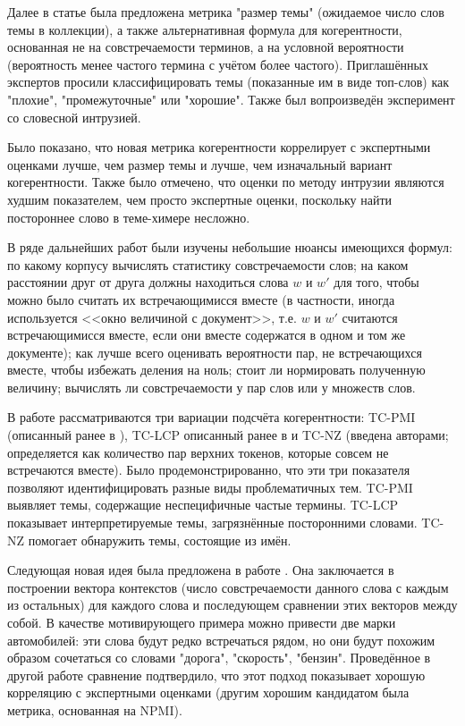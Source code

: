 Далее в статье \cite{mimno2011} была предложена метрика "размер темы" (ожидаемое число слов темы в коллекции), а также альтернативная формула для когерентности, основанная не на совстречаемости терминов, а на условной вероятности (вероятность менее частого термина с учётом более частого). Приглашённых экспертов просили классифицировать темы (показанные им в виде топ-слов) как "плохие", "промежуточные" или "хорошие". Также был вопроизведён эксперимент со словесной интрузией. 

Было показано, что новая метрика когерентности коррелирует с экспертными оценками лучше, чем размер темы и лучше, чем изначальный вариант когерентности. Также было отмечено, что оценки по методу интрузии являются худшим показателем, чем просто экспертные оценки, поскольку найти постороннее слово в теме-химере несложно.

В ряде дальнейших работ были изучены небольшие нюансы имеющихся формул: по какому корпусу вычислять статистику совстречаемости слов; на каком расстоянии друг от друга должны находиться слова $w$ и $w'$ для того, чтобы можно было считать их встречающимисся вместе (в частности, иногда используется <<окно величиной с документ>>, т.е. $w$ и $w'$ считаются встречающимисся вместе, если они вместе содержатся в одном и том же документе); как лучше всего оценивать вероятности пар, не встречающихся вместе, чтобы избежать деления на ноль; стоит ли нормировать полученную величину; вычислять ли совстречаемости у пар слов или у множеств слов.

В работе \cite{boydcare} рассматриваются три вариации подсчёта когерентности: TC-PMI (описанный ранее в \cite{newman2010automatic}), TC-LCP описанный ранее в \cite{mimno} и TC-NZ (введена авторами; определяется как количество пар верхних токенов, которые совсем не встречаются вместе). Было продемонстрированно, что эти три показателя позволяют идентифицировать разные виды проблематичных тем. TC-PMI выявляет темы, содержащие неспецифичные частые термины. TC-LCP показывает интерпретируемые темы, загрязнённые посторонними словами. TC-NZ помогает обнаружить темы, состоящие из имён.

Следующая новая идея была предложена в работе \cite{aletras2013evaluating}. Она заключается в построении вектора контекстов (число совстречаемости данного слова с каждым из остальных) для каждого слова и последующем сравнении этих векторов между собой. В качестве мотивирующего примера можно привести две марки автомобилей: эти слова будут редко встречаться рядом, но они будут похожим образом сочетаться со словами "дорога", "скорость", "бензин". Проведённое в другой работе \cite{mrtl} сравнение подтвердило, что этот подход показывает хорошую корреляцию с экспертными оценками (другим хорошим кандидатом была метрика, основанная на NPMI).

